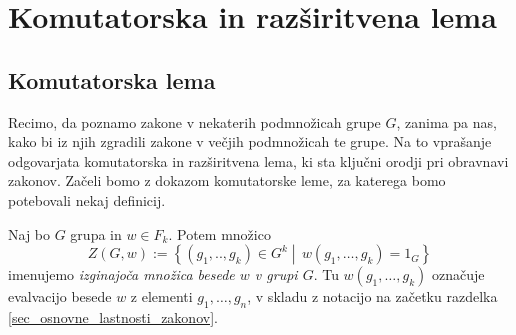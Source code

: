 

\section{Komutatorska in razširitvena lema}

\subsection{Komutatorska lema}



Recimo, da poznamo zakone v nekaterih podmnožicah grupe $G$, zanima pa nas, kako bi iz njih zgradili zakone v večjih podmnožicah te grupe. Na to vprašanje odgovarjata komutatorska in razširitvena lema,
ki sta ključni orodji pri obravnavi zakonov. Začeli bomo z dokazom komutatorske leme, za katerega bomo potebovali nekaj definicij.

\begin{definicija}
    \label{def_izginjajoca_mnozica}
    Naj bo $G$ grupa in $w \in  F_k$. Potem množico \begin{equation*}
    Z(G, w) := \left\{ (g_1, .., g_{k}) \in  G^{k}  \middle|\, w(g_1, \ldots, g_{k}) = 1_G \right\} 
    \end{equation*}  
    imenujemo \emph{izginajoča množica besede $w$ v grupi $G$}. Tu $w(g_1, \ldots, g_{k})$ označuje evalvacijo besede $w$ z elementi $g_1, \ldots, g_n$, v skladu z notacijo na začetku razdelka \ref{sec_osnovne_lastnosti_zakonov}.  
    \end{definicija}





